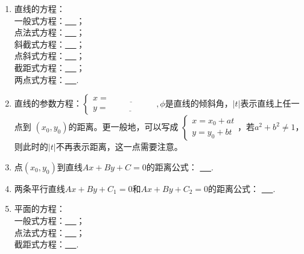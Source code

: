 \documentclass{article}
\newif\ifte
\begin{document}
\begin{multicols}{2}
\begin{enumerate}[leftmargin=20pt]
\item 直线的方程：\\
一般式方程：\underline{\ \ifte $ Ax+By+C=0 $\else \hspace{4cm} \fi\ }；\\
点法式方程：\underline{\ \ifte $ A(x-x_0)+B(y-y_0)=0 $
    \else \hspace{4cm} \fi\ }；\\
斜截式方程：\underline{\ \ifte $ y=kx+b $\else \hspace{4cm} \fi\ }；\\
点斜式方程：\underline{\ \ifte $ y-y_0=k(x-x_0) $
    \else \hspace{4cm} \fi\ }； \\
截距式方程：\underline{\ \ifte $ \dfrac{x}{a}+\dfrac{y}{b}=1 $
    \else \hspace{4cm} \fi\ }；\\
两点式方程：\underline{\ \ifte $ \dfrac{y-y_1}{x-x_1}=
    \dfrac{y_2-y_1}{x_2-x_1} $\else \hspace{4cm} \fi\ }.

\item 直线的参数方程：$ \left\{ \begin{aligned}
    x=\underline{\ \ifte x_0+t\cos \phi \else \hspace{2cm} \fi\ } \\
    y=\underline{\ \ifte y_0+t\sin \phi \else \hspace{2cm} \fi\ }
\end{aligned} \right. ,\phi $是直线的倾斜角，$ |t| $表示直线上任一点到
$ (x_0,y_0) $的距离。更一般地，可以写成
$ \left\{ \begin{aligned}
    x=x_0+at \\
    y=y_0+bt
\end{aligned} \right. $，若$ a^2+b^2\neq 1 $，
则此时的$ |t| $不再表示距离，这一点需要注意。

\item 点$ (x_0,y_0) $到直线$ Ax+By+C=0 $的距离公式：
\underline{\ \ifte $ \dfrac{|Ax_0+By_0+C|}{\sqrt{A^2+B^2}} $
    \else \hspace{2cm} \fi\ }.

\item 两条平行直线$ Ax+By+C_1=0 $和$ Ax+By+C_2=0 $的距离公式：
\underline{\ \ifte $ \dfrac{|C_1-C_2|}{\sqrt{A^2+B^2}} $
    \else \hspace{2cm} \fi\ }.

\item 平面的方程：\\
一般式方程：\underline{\ \ifte $ Ax+By+Cz+D=0 $
    \else \hspace{4cm} \fi\ }；\\
点法式方程：\underline{\ \ifte $ A(x-x_0)+B(y-y_0)+C(z-z_0)=0 $
    \else \hspace{4cm} \fi\ }；\\
截距式方程：\underline{\ \ifte $ \dfrac{x}{a}+\dfrac{y}{b}+
    \dfrac{z}{c}=1 $\else \hspace{4cm} \fi\ }.


\end{enumerate}
\end{multicols}
\end{document}
